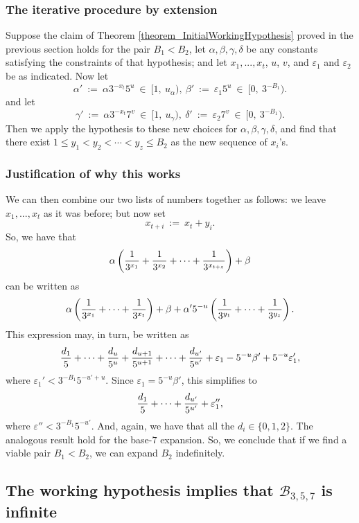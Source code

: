 \documentclass[12pt]{article}
\begin{document}
\subsubsection{The iterative procedure by extension} 

Suppose the claim of Theorem \ref{theorem_InitialWorkingHypothesis} 
proved in the previous section holds for the pair 
$B_1 < B_2$, let $\alpha, \beta, \gamma, \delta$ be any constants 
satisfying the constraints of that hypothesis; and let $x_1, ..., x_t$,
$u$, $v$, and $\varepsilon_1$ and $\varepsilon_2$ be as indicated.  
Now let 
$$
\alpha'\ :=\ \alpha 3^{-x_t}5^u\ \in\ [1,\ u_{\alpha}),\ \beta'\ :=\ \varepsilon_1 5^u\ \in\ 
[0,\ 3^{-B_1}).
$$  
and let
$$
\gamma'\ :=\ \alpha 3^{-x_t}7^v\ \in\ [1,\ u_{\gamma}),\ 
\delta'\ :=\ \varepsilon_2 7^v\ \in\ [0,\ 3^{-B_1}).
$$
Then we apply the hypothesis to these new choices for $\alpha, \beta, \gamma,
\delta$, and find that there exist 
$1 \leq y_1 < y_2 < \cdots < y_z \leq B_2$ as the new sequence of $x_i$'s.  

\subsubsection{Justification of why this works} 

We can then combine our two lists of numbers together as follows:  we leave
$x_1,...,x_t$ as it was before; but now set
$$
x_{t+i}\ :=\ x_t + y_i. 
$$
So, we have that 
$$
\alpha \left ( {1 \over 3^{x_1}} + {1 \over 3^{x_2}} + \cdots + 
{1 \over 3^{x_{t+z}}} \right ) + \beta
$$
can be written as
$$
\alpha \left ( {1 \over 3^{x_1}} + \cdots + {1 \over 3^{x_t}}\right ) + \beta
+ \alpha' 5^{-u} \left ( {1 \over 3^{y_1}} + \cdots + {1 \over 3^{y_z}} \right ).
$$
This expression may, in turn, be written as
$$
{d_1 \over 5} + \cdots + {d_u \over 5^u} + {d_{u+1} \over 5^{u+1}} 
+ \cdots + {d_{u'} \over 5^{u'}} + \varepsilon_1 - 5^{-u} \beta' + 
5^{-u} \varepsilon_1',
$$
where $\varepsilon_1' < 3^{-B_1} 5^{-u'+u}$.  Since $\varepsilon_1 = 5^{-u}\beta'$, this simplifies to
$$
{d_1 \over 5} + \cdots + {d_{u'} \over 5^{u'}} + \varepsilon_1'',
$$
where $\varepsilon'' < 3^{-B_1} 5^{-u'}$.
And, again, we have that all the $d_i \in \{0,1,2\}$.
The analogous result hold for the base-$7$ expansion.  So, we conclude 
that if we find a viable pair $B_1 < B_2$, we can expand $B_2$ indefinitely.

\subsection{The working hypothesis implies that $\mathcal{B}_{3,5,7}$ is infinite}
\end{document}
